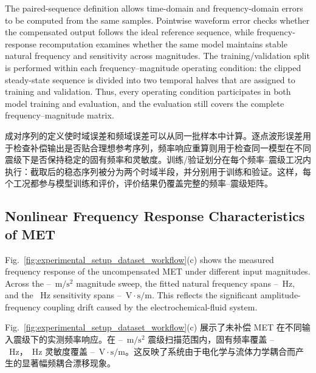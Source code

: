 \documentclass[sn-nature]{sn-jnl}
\newif\ifCNENEnglish
\newif\ifCNENBilingual
\newcommand{\CNEN}[2]{%
    \ifCNENBilingual
        #1%
        \if\relax\detokenize{#2}\relax\else\par #2\fi%
    \else
        \ifCNENEnglish
            #2%
        \else
            #1%
        \fi
    \fi
}
\begin{document}
\CNEN{成对序列的定义使时域误差和频域误差可以从同一批样本中计算。逐点波形误差用于检查补偿输出是否贴合理想参考序列，频率响应重算则用于检查同一模型在不同震级下是否保持稳定的固有频率和灵敏度。训练/验证划分在每个频率--震级工况内执行：截取后的稳态序列被分为两个时域半段，并分别用于训练和验证。这样，每个工况都参与模型训练和评价，评价结果仍覆盖完整的频率--震级矩阵。}{The paired-sequence definition allows time-domain and frequency-domain errors to be computed from the same samples. Pointwise waveform error checks whether the compensated output follows the ideal reference sequence, while frequency-response recomputation examines whether the same model maintains stable natural frequency and sensitivity across magnitudes. The training/validation split is performed within each frequency--magnitude operating condition: the clipped steady-state sequence is divided into two temporal halves that are assigned to training and validation. Thus, every operating condition participates in both model training and evaluation, and the evaluation still covers the complete frequency--magnitude matrix.}

\subsection{Nonlinear Frequency Response Characteristics of MET}

\CNEN{Fig.~\ref{fig:experimental_setup_dataset_workflow}(c) 展示了未补偿 MET 在不同输入震级下的实测频率响应。在 \valMagScanStart--\valMagScanEnd~$\text{m}/\text{s}^2$ 震级扫描范围内，固有频率覆盖 \valMetFnMin--\valMetFnMax~Hz，\valSensitivityCompareFreq~Hz 灵敏度覆盖 \valMetSensMin--\valMetSensMax~$\text{V}\cdot\text{s}/\text{m}$。这反映了系统由于电化学与流体力学耦合而产生的显著幅频耦合漂移现象。}{Fig.~\ref{fig:experimental_setup_dataset_workflow}(c) shows the measured frequency response of the uncompensated MET under different input magnitudes. Across the \valMagScanStart--\valMagScanEnd~$\text{m}/\text{s}^2$ magnitude sweep, the fitted natural frequency spans \valMetFnMin--\valMetFnMax~Hz, and the \valSensitivityCompareFreq~Hz sensitivity spans \valMetSensMin--\valMetSensMax~$\text{V}\cdot\text{s}/\text{m}$. This reflects the significant amplitude-frequency coupling drift caused by the electrochemical-fluid system.%
}
\end{document}
